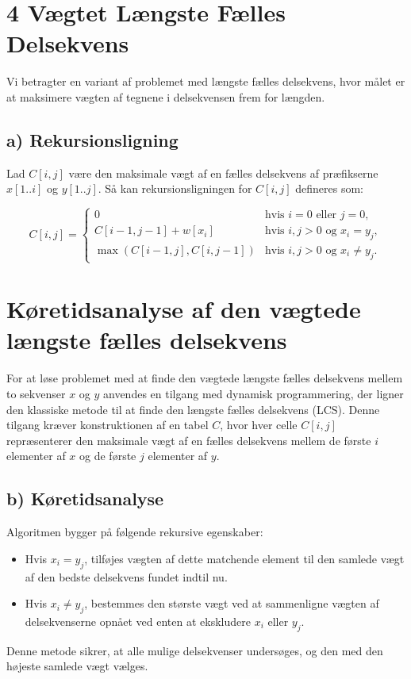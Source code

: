 \documentclass{article}
\begin{document}
\section*{4 Vægtet Længste Fælles Delsekvens}

Vi betragter en variant af problemet med længste fælles delsekvens, hvor målet er at maksimere vægten af tegnene i delsekvensen frem for længden.

\subsection*{a) Rekursionsligning}

Lad \(C[i, j]\) være den maksimale vægt af en fælles delsekvens af præfikserne \(x[1..i]\) og \(y[1..j]\). Så kan rekursionsligningen for \(C[i, j]\) defineres som:

\[
C[i, j] = \begin{cases}
0 & \text{hvis } i = 0 \text{ eller } j = 0,\\
C[i-1, j-1] + w[x_i] & \text{hvis } i, j > 0 \text{ og } x_i = y_j,\\
\max(C[i-1, j], C[i, j-1]) & \text{hvis } i, j > 0 \text{ og } x_i \neq y_j.
\end{cases}
\]

\section*{Køretidsanalyse af den vægtede længste fælles delsekvens}

For at løse problemet med at finde den vægtede længste fælles delsekvens mellem to sekvenser \(x\) og \(y\) anvendes en tilgang med dynamisk programmering, der ligner den klassiske metode til at finde den længste fælles delsekvens (LCS). Denne tilgang kræver konstruktionen af en tabel \(C\), hvor hver celle \(C[i,j]\) repræsenterer den maksimale vægt af en fælles delsekvens mellem de første \(i\) elementer af \(x\) og de første \(j\) elementer af \(y\).

\subsection*{b) Køretidsanalyse}
Algoritmen bygger på følgende rekursive egenskaber:
\begin{itemize}
    \item Hvis \(x_i = y_j\), tilføjes vægten af dette matchende element til den samlede vægt af den bedste delsekvens fundet indtil nu.
    \item Hvis \(x_i \neq y_j\), bestemmes den største vægt ved at sammenligne vægten af delsekvenserne opnået ved enten at ekskludere \(x_i\) eller \(y_j\).
\end{itemize}
Denne metode sikrer, at alle mulige delsekvenser undersøges, og den med den højeste samlede vægt vælges.
\\
\\
\end{document}
